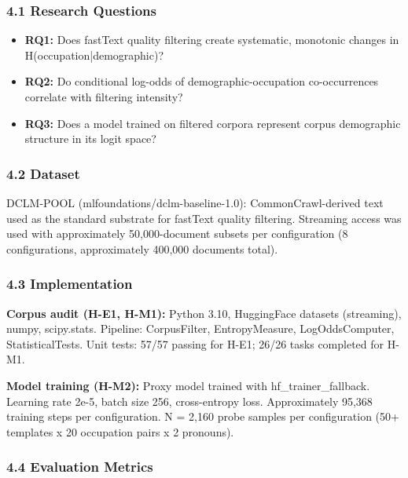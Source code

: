 
\subsubsection{4.1 Research Questions}

\begin{itemize}
\item \textbf{RQ1:} Does fastText quality filtering create systematic, monotonic changes in H(occupation|demographic)?
\item \textbf{RQ2:} Do conditional log-odds of demographic-occupation co-occurrences correlate with filtering intensity?
\item \textbf{RQ3:} Does a model trained on filtered corpora represent corpus demographic structure in its logit space?
\end{itemize}

\subsubsection{4.2 Dataset}

DCLM-POOL (mlfoundations/dclm-baseline-1.0): CommonCrawl-derived text used as the standard substrate for fastText quality filtering. Streaming access was used with approximately 50,000-document subsets per configuration (8 configurations, approximately 400,000 documents total).

\subsubsection{4.3 Implementation}

\textbf{Corpus audit (H-E1, H-M1):} Python 3.10, HuggingFace datasets (streaming), numpy, scipy.stats. Pipeline: CorpusFilter, EntropyMeasure, LogOddsComputer, StatisticalTests. Unit tests: 57/57 passing for H-E1; 26/26 tasks completed for H-M1.

\textbf{Model training (H-M2):} Proxy model trained with hf\_trainer\_fallback. Learning rate 2e-5, batch size 256, cross-entropy loss. Approximately 95,368 training steps per configuration. N = 2,160 probe samples per configuration (50+ templates x 20 occupation pairs x 2 pronouns).

\subsubsection{4.4 Evaluation Metrics}

